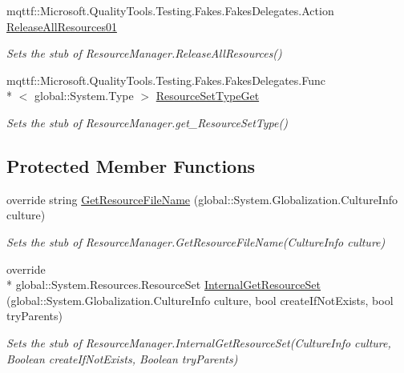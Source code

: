 \begin{DoxyCompactItemize}
mqttf\-::\-Microsoft.\-Quality\-Tools.\-Testing.\-Fakes.\-Fakes\-Delegates.\-Action \hyperlink{class_system_1_1_component_model_1_1_fakes_1_1_stub_component_resource_manager_a02a306860f377ec43fb6f35fd39791a9}{Release\-All\-Resources01}
\begin{DoxyCompactList}\small\item\em Sets the stub of Resource\-Manager.\-Release\-All\-Resources()\end{DoxyCompactList}\item 
mqttf\-::\-Microsoft.\-Quality\-Tools.\-Testing.\-Fakes.\-Fakes\-Delegates.\-Func\\*
$<$ global\-::\-System.\-Type $>$ \hyperlink{class_system_1_1_component_model_1_1_fakes_1_1_stub_component_resource_manager_a7a5b7c1e37da2404c3fa7eea480d49af}{Resource\-Set\-Type\-Get}
\begin{DoxyCompactList}\small\item\em Sets the stub of Resource\-Manager.\-get\-\_\-\-Resource\-Set\-Type()\end{DoxyCompactList}\end{DoxyCompactItemize}
\subsection*{Protected Member Functions}
\begin{DoxyCompactItemize}
\item 
override string \hyperlink{class_system_1_1_component_model_1_1_fakes_1_1_stub_component_resource_manager_a3b3a9fcdaaa94a74aa18475e8831057e}{Get\-Resource\-File\-Name} (global\-::\-System.\-Globalization.\-Culture\-Info culture)
\begin{DoxyCompactList}\small\item\em Sets the stub of Resource\-Manager.\-Get\-Resource\-File\-Name(\-Culture\-Info culture)\end{DoxyCompactList}\item 
override \\*
global\-::\-System.\-Resources.\-Resource\-Set \hyperlink{class_system_1_1_component_model_1_1_fakes_1_1_stub_component_resource_manager_a0884c3ce9fd35a563c6e4805dad9b028}{Internal\-Get\-Resource\-Set} (global\-::\-System.\-Globalization.\-Culture\-Info culture, bool create\-If\-Not\-Exists, bool try\-Parents)
\begin{DoxyCompactList}\small\item\em Sets the stub of Resource\-Manager.\-Internal\-Get\-Resource\-Set(\-Culture\-Info culture, Boolean create\-If\-Not\-Exists, Boolean try\-Parents)\end{DoxyCompactList}\end{DoxyCompactItemize}
